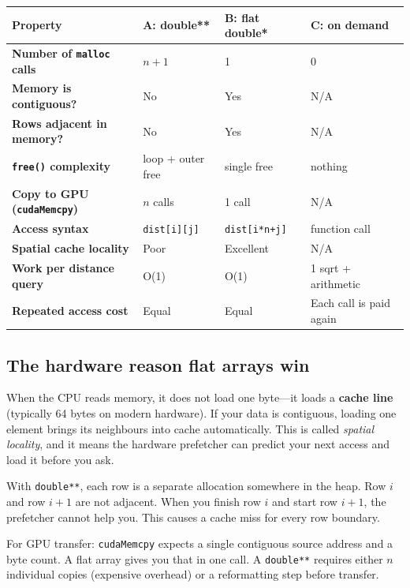 \begin{center}
\renewcommand{\arraystretch}{1.6}
\begin{tabularx}{\textwidth}{>{\bfseries}p{4.2cm} X X X}
\toprule
Property & \textbf{A: double**} & \textbf{B: flat double*} & \textbf{C: on demand} \\
\midrule
Number of \texttt{malloc} calls & $n + 1$ & 1 & 0 \\
Memory is contiguous? & No & Yes & N/A \\
Rows adjacent in memory? & No & Yes & N/A \\
\texttt{free()} complexity & loop + outer free & single free & nothing \\
Copy to GPU (\texttt{cudaMemcpy}) & $n$ calls & 1 call & N/A \\
Access syntax & \texttt{dist[i][j]} & \texttt{dist[i*n+j]} & function call \\
Spatial cache locality & Poor & Excellent & N/A \\
Work per distance query & O(1) & O(1) & 1 sqrt + arithmetic \\
Repeated access cost & Equal & Equal & Each call is paid again \\
\bottomrule
\end{tabularx}
\end{center}

\subsection{The hardware reason flat arrays win}

When the CPU reads memory, it does not load one byte---it loads a \textbf{cache line} (typically 64 bytes on modern hardware). If your data is contiguous, loading one element brings its neighbours into cache automatically. This is called \emph{spatial locality}, and it means the hardware prefetcher can predict your next access and load it before you ask.

With \texttt{double**}, each row is a separate allocation somewhere in the heap. Row $i$ and row $i+1$ are not adjacent. When you finish row $i$ and start row $i+1$, the prefetcher cannot help you. This causes a cache miss for every row boundary.

For GPU transfer: \texttt{cudaMemcpy} expects a single contiguous source address and a byte count. A flat array gives you that in one call. A \texttt{double**} requires either $n$ individual copies (expensive overhead) or a reformatting step before transfer.

